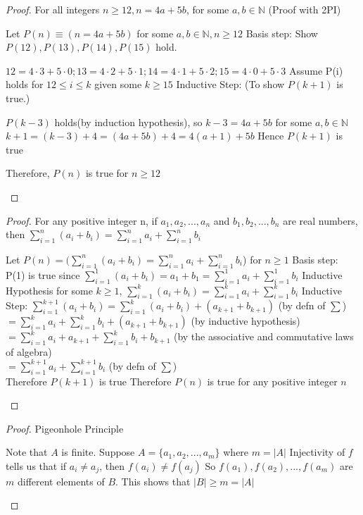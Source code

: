 \documentclass[a4paper]{article}
\theoremstyle{definition}
\begin{document}
\begin{proof} For all integers $n \geq 12, n = 4a + 5b$, for some $a,b \in \mathbb{N}$ (Proof with 2PI)
  \begin{numpf}
    \pfln Let $P(n) \equiv (n = 4a + 5b)$ for some $a, b \in \mathbb{N}, n \geq 12$
    \pfln Basis step: Show $P(12), P(13), P(14), P(15)$ hold. 

    $12 = 4 \cdot 3 + 5 \cdot 0; 13 = 4 \cdot 2 + 5 \cdot 1; 14 = 4 \cdot 1 + 5 \cdot 2; 15 = 4 \cdot 0 + 5 \cdot 3$
    \pfln Assume P(i) holds for $12 \leq i \leq k$ given some $k \geq 15$
    \pfln Inductive Step: (To show $P(k+1)$ is true.)
    \begin{subpf}
      \pfln $P(k-3)$ holds(by induction hypothesis), so $k-3 = 4a+5b$ for some $a, b \in \mathbb{N}$
      \pfln $k + 1 = (k-3)+4 = (4a+5b)+4 = 4(a+1) + 5b$
      \pfln Hence $P(k+1)$ is true
    \end{subpf}
    \pfln Therefore, $P(n)$ is true for $n \geq 12$
  \end{numpf}
\end{proof}

\begin{proof} For any positive integer n, if $a_1, a_2,...,a_n$ and $b_1, b_2,...,b_n$ are real numbers, then $\sum^n_{i=1}(a_i+b_i) = \sum^n_{i=1}a_i + \sum^n_{i=1}b_i$ 
  \begin{numpf}
    \pfln Let $P(n) = (\sum^n_{i=1}(a_i+b_i) = \sum^n_{i=1}a_i + \sum^n_{i=1}b_i$) for $n \geq 1$
    \pfln Basis step: P(1) is true since $\sum^1_{i=1}(a_i+b_i) = a_1 + b_1 = \sum^1_{i=1}a_i + \sum^1_{i=1}b_i$
    \pfln Inductive Hypothesis for some $k \geq 1$, $\sum^k_{i=1}(a_i+b_i) = \sum^k_{i=1}a_i + \sum^k_{i=1}b_i$
    \pfln Inductive Step: $\sum^{k+1}_{i=1}(a_i+b_i) = \sum^{k}_{i=1}(a_i+b_i) + (a_{k+1} + b_{k+1})$ (by defn of $\sum$)\\
    $ = \sum^k_{i=1}a_i + \sum^k_{i=1}b_i + (a_{k+1} + b_{k+1})$ (by inductive hypothesis)\\
    $ = \sum^k_{i=1}a_i + a_{k+1} +  \sum^k_{i=1}b_i + b_{k+1}$ (by the associative and commutative laws of algebra)\\
    $ = \sum^{k+1}_{i=1}a_i + \sum^{k+1}_{i=1}b_i$ (by defn of $\sum$)\\
    Therefore $P(k+1)$ is true
    \pfln Therefore $P(n)$ is true for any positive integer $n$
  \end{numpf}
\end{proof}

\begin{proof} Pigeonhole Principle
  \begin{numpf}
    \pfln Note that $A$ is finite. Suppose $A = \{a_1, a_2, ..., a_m\}$ where $m = |A|$
    \pfln Injectivity of $f$ tells us that if $a_i \not = a_j$, then $f(a_i) \not = f(a_j)$
    \pfln So $f(a_1), f(a_2), ..., f(a_m)$ are $m$ different elements of $B$.
    \pfln This shows that $|B| \geq m = |A|$
  \end{numpf}
\end{proof}
\end{document}
